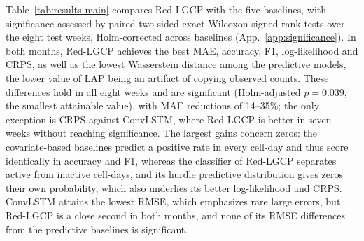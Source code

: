 Table~\ref{tab:results-main} compares Red-LGCP with the five baselines, with significance assessed by paired two-sided exact Wilcoxon signed-rank tests over the eight test weeks, Holm-corrected across baselines (App.~\ref{app:significance}). In both months, Red-LGCP achieves the best MAE, accuracy, F1, log-likelihood and CRPS, as well as the lowest Wasserstein distance among the predictive models, the lower value of LAP being an artifact of copying observed counts. These differences hold in all eight weeks and are significant (Holm-adjusted $p=0.039$, the smallest attainable value), with MAE reductions of 14--35\%; the only exception is CRPS against ConvLSTM, where Red-LGCP is better in seven weeks without reaching significance. The largest gains concern zeros: the covariate-based baselines predict a positive rate in every cell-day and thus score identically in accuracy and F1, whereas the classifier of Red-LGCP separates active from inactive cell-days, and its hurdle predictive distribution gives zeros their own probability, which also underlies its better log-likelihood and CRPS. ConvLSTM attains the lowest RMSE, which emphasizes rare large errors, but Red-LGCP is a close second in both months, and none of its RMSE differences from the predictive baselines is significant.
